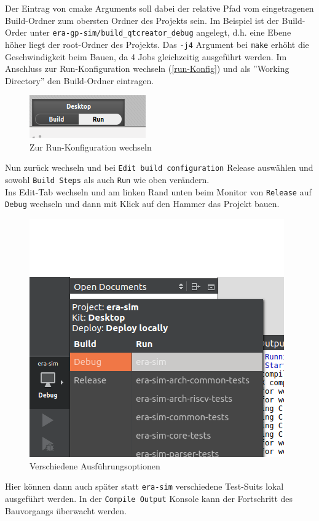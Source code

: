 Der Eintrag von cmake Arguments soll dabei der relative Pfad vom eingetragenen
Build-Ordner zum obersten Ordner des Projekts sein. Im Beispiel ist der
Build-Order unter \texttt{era-gp-sim/build\_qtcreator\_debug} angelegt, d.h.
eine Ebene höher liegt der root-Ordner des Projekts. Das \texttt{-j4} Argument
bei \texttt{make} erhöht die Geschwindigkeit beim Bauen, da 4 Jobs gleichzeitig
ausgeführt werden. Im Anschluss zur Run-Konfiguration wechseln (\autoref{run-Konfig}) und als ''Working
Directory'' den Build-Ordner eintragen.\\
\begin{figure}
	\centering
	\includegraphics[scale=1.0]{images/setup-qtcreator-run-config}
	\caption{Zur Run-Konfiguration wechseln}
	\label{run-Konfig}
\end{figure}
Nun zurück wechseln und bei \texttt{Edit build configuration} Release auswählen und
sowohl \texttt{Build Steps} als auch \texttt{Run} wie oben verändern.\\
Ins Edit-Tab wechseln und am linken Rand unten beim Monitor von \texttt{Release} auf
\texttt{Debug} wechseln und dann mit Klick auf den Hammer das Projekt bauen.\\
\begin{figure}[H]
	\centering
	\includegraphics[scale=0.7]{images/setup-qtcreator-change-buildrun-flavor.png}
	\caption{Verschiedene Ausführungsoptionen}
\end{figure}
Hier können dann auch später statt \texttt{era-sim} verschiedene Test-Suits lokal
ausgeführt werden. In der \texttt{Compile Output} Konsole kann der Fortschritt des
Bauvorgangs überwacht werden.\\


